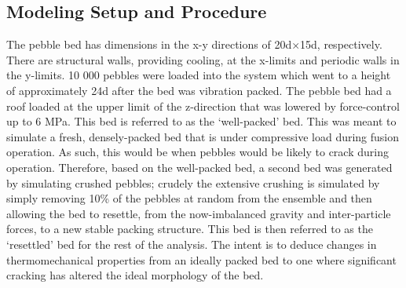 \subsection{Modeling Setup and Procedure}
The pebble bed has dimensions in the x-y directions of 20d×15d, respectively. There are structural walls, providing cooling, at the x-limits and periodic walls in the y-limits. 10 000 pebbles were loaded into the system which went to a height of approximately 24d after the bed was vibration packed. The pebble bed had a roof loaded at the upper limit of the z-direction that was lowered by force-control up to 6 MPa. This bed is referred to as the ‘well-packed’ bed. This was meant to simulate a fresh, densely-packed bed that is under compressive load during fusion operation. As such, this would be when pebbles would be likely to crack during operation. Therefore, based on the well-packed bed, a second bed was generated by simulating crushed pebbles; crudely the extensive crushing is simulated by simply removing 10\% of the pebbles at random from the ensemble and then allowing the bed to resettle, from the now-imbalanced gravity and inter-particle forces, to a new stable packing structure. This bed is then referred to as the ‘resettled’ bed for the rest of the analysis. The intent is to deduce changes in thermomechanical properties from an ideally packed bed to one where significant cracking has altered the ideal morphology of the bed.